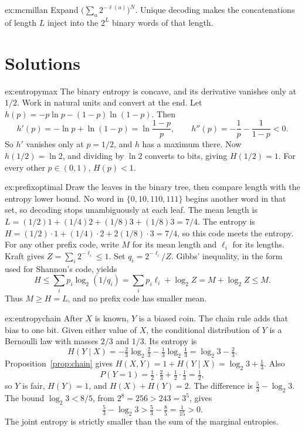 \begin{hint}{ex:mcmillan}
Expand $\bigl(\sum_a 2^{-\ell(a)}\bigr)^N$. Unique decoding makes the concatenations of length $L$ inject into the $2^L$ binary words of that length.
\end{hint}

\section{Solutions}

\begin{solution}{ex:entropymax}
\idea The binary entropy is concave, and its derivative vanishes only at $1/2$.
\writeup Work in natural units and convert at the end. Let $h(p)=-p\ln p-(1-p)\ln(1-p)$. Then
\[
 h'(p)=-\ln p+\ln(1-p)=\ln\frac{1-p}{p},\qquad h''(p)=-\frac1p-\frac1{1-p}<0.
\]
So $h'$ vanishes only at $p=1/2$, and $h$ has a maximum there. Now $h(1/2)=\ln 2$, and dividing by $\ln 2$ converts to bits, giving $H(1/2)=1$. For every other $p\in(0,1)$, $H(p)<1$.
\end{solution}


\begin{solution}{ex:prefixoptimal}
\idea Draw the leaves in the binary tree, then compare length with the entropy lower bound.
\writeup No word in $\{0,10,110,111\}$ begins another word in that set, so decoding stops unambiguously at each leaf. The mean length is $L=(1/2)1+(1/4)2+(1/8)3+(1/8)3=7/4$. The entropy is $H=(1/2)\cdot1+(1/4)\cdot2+2(1/8)\cdot3=7/4$, so this code meets the entropy. For any other prefix code, write $M$ for its mean length and $\ell_i$ for its lengths. Kraft gives $Z=\sum_i2^{-\ell_i}\le1$. Set $q_i=2^{-\ell_i}/Z$. Gibbs' inequality, in the form used for Shannon's code, yields
\[
 H\le\sum_i p_i\log_2(1/q_i)=\sum_i p_i\ell_i+\log_2 Z=M+\log_2 Z\le M.
\]
Thus $M\ge H=L$, and no prefix code has smaller mean.
\end{solution}

\begin{solution}{ex:entropychain}
\idea After $X$ is known, $Y$ is a biased coin. The chain rule adds that bias to one bit.
\writeup Given either value of $X$, the conditional distribution of $Y$ is a Bernoulli law with masses $2/3$ and $1/3$. Its entropy is
\[
 H(Y\mid X)=-\tfrac23\log_2\tfrac23-\tfrac13\log_2\tfrac13
 =\log_2 3-\tfrac23.
\]
Proposition~\ref{prop:chain} gives $H(X,Y)=1+H(Y\mid X)=\log_2 3+\tfrac13$. Also
\[
 P(Y=1)=\tfrac12\cdot\tfrac23+\tfrac12\cdot\tfrac13=\tfrac12,
\]
so $Y$ is fair, $H(Y)=1$, and $H(X)+H(Y)=2$. The difference is $\tfrac53-\log_2 3$. The bound $\log_2 3<8/5$, from $2^8=256>243=3^5$, gives
\[
 \tfrac53-\log_2 3>\tfrac53-\tfrac85=\tfrac1{15}>0.
\]
The joint entropy is strictly smaller than the sum of the marginal entropies.
\end{solution}

